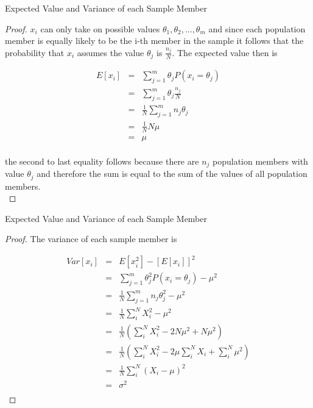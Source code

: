 \documentclass{beamer}
\numberwithin{equation}{section}
\begin{document}
\begin{frame}{Expected Value and Variance of each Sample Member}
\scriptsize

\begin{proof}\tiny
$x_i$ can only take on possible values $\theta_1,\theta_2,...,\theta_m$ and since each population member is equally likely to be the i-th member in the sample it follows that the probability that $x_i$ assumes the value $\theta_j$ is $\frac{n_j}{N}$. The expected value then is

\begin{eqnarray}
E[x_i]&=&\sum_{j=1}^{m} \theta_j P(x_i=\theta_j)\\
  &=&   \sum_{j=1}^{m} \theta_j  \frac{n_j}{N} \\
  &=&  \frac{1}{N} \sum_{j=1}^{m}n_j\theta_j\\
  &=&  \frac{1}{N} N \mu\\
  &=& \mu \\
\end{eqnarray}

the second to last equality follows because there are $n_j$ population members with value $\theta_j$ and therefore the sum is equal to the sum of the values of all population members.\\
\end{proof}
\end{frame}


\begin{frame}{Expected Value and Variance of each Sample Member}
\scriptsize

\begin{proof}\tiny
The variance of each sample member is

\begin{eqnarray}
Var[x_i] &=& E[x_i^2]-[E[x_i]]^2 \\
  &=&  \sum_{j=1}^{m}\theta_j^2P(x_i=\theta_j) - \mu^2\\
  &=& \frac{1}{N} \sum_{j=1}^{m}n_j\theta_j^2 - \mu^2\\
    &=& \frac{1}{N}  \sum_i^N X_i^2 - \mu^2 \\
    &=&  \frac{1}{N}    ( \sum_i^N X_i^2 - 2N\mu^2 + N \mu^2 )  \\
    &=&  \frac{1}{N}    ( \sum_i^N X_i^2 - 2\mu \sum_i^N X_i + \sum_i^N \mu^2 )\\
   &=& \frac{1}{N}   \sum_i^N (X_i-\mu)^2\\ 
    &=& \sigma^2\\
\end{eqnarray}
\end{proof}
\end{frame}
\end{document}
